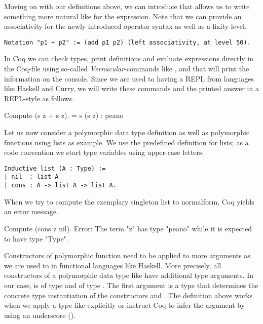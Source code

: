 Moving on with our definitions above, we can introduce  that allows us to write something more natural like  for the expression.
Note that we can provide an associativity for the newly introduced operator syntax as well as a fixity level.

\begin{verbatim}
Notation "p1 + p2" := (add p1 p2) (left associativity, at level 50).
\end{verbatim}

In Coq we can check types, print definitions and evaluate expressions directly in the Coq-file using so-called \emph{Vernacular}-commands like ,  and  that will print the information on the console.
Since we are used to having a REPL from languages like Haskell and Curry, we will write these commands and the printed answer in a REPL-style as follows.

\begin{crepl}
\coqrepl Compute (s z + s z).
   = s (s z)
   : peano
\end{crepl}

Let us now consider a polymorphic data type definition as well as polymorphic functions using lists as example.
We use the predefined definition for lists; as a code convention we start type variables using upper-case letters.

\begin{verbatim}
Inductive list (A : Type) :=
| nil  : list A
| cons : A -> list A -> list A.
\end{verbatim}

When we try to compute the exemplary singleton list  to normalform, Coq yields an error message.

\begin{crepl}
\coqrepl Compute (cons z nil).
Error: The term "z" has type "peano" while it is expected to have type
       "Type".
\end{crepl}

Constructors of polymorphic function need to be applied to more arguments as we are used to in functional languages like Haskell.
More precisely, all constructors of a polymorphic data type like  have additional type arguments.
In our case,  is of type  and  of type .
The first argument is a type that determines the concrete type instantiation of the constructors  and .
The definition above works when we apply a type like  explicitly or instruct Coq to infer the argument by using an underscore (\cinl{_}).

